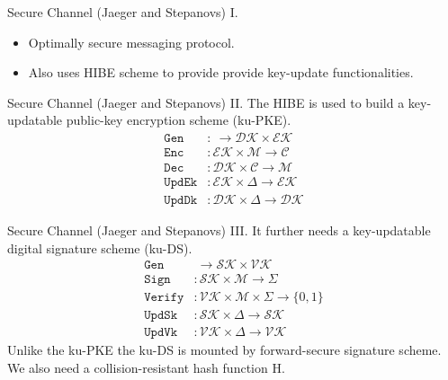 \documentclass{beamer}
\begin{document}
\begin{frame}{Secure Channel (Jaeger and Stepanovs) I.}
  \begin{itemize}
  \item Optimally secure messaging protocol.
  \item Also uses HIBE scheme to provide provide key-update
    functionalities.
  \end{itemize}
\end{frame}

\begin{frame}{Secure Channel (Jaeger and Stepanovs) II.}
  The HIBE is used to build a key-updatable public-key encryption scheme (ku-PKE).
  \begin{align*}
    \texttt{Gen} & : \ \rightarrow \mathcal{DK} \times \mathcal{EK} \\
    \texttt{Enc} & : \mathcal{EK} \times \mathcal{M} \rightarrow \mathcal{C} \\
    \texttt{Dec} & : \mathcal{DK} \times \mathcal{C} \rightarrow \mathcal{M} \\
    \texttt{UpdEk} & : \mathcal{EK} \times \Delta \rightarrow \mathcal{EK} \\
    \texttt{UpdDk} & : \mathcal{DK} \times \Delta \rightarrow \mathcal{DK}
  \end{align*}
\end{frame}

\begin{frame}{Secure Channel (Jaeger and Stepanovs) III.}
  It further needs a key-updatable digital signature scheme (ku-DS).
  \begin{align*}
    \texttt{Gen} & \  \rightarrow \mathcal{SK} \times \mathcal{VK} \\
    \texttt{Sign} & : \mathcal{SK} \times \mathcal{M} \rightarrow \Sigma \\
    \texttt{Verify} & : \mathcal{VK} \times \mathcal{M} \times \Sigma \rightarrow \{0,1\} \\
    \texttt{UpdSk} & : \mathcal{SK} \times \Delta \rightarrow \mathcal{SK} \\
    \texttt{UpdVk} & : \mathcal{VK} \times \Delta \rightarrow \mathcal{VK}
  \end{align*}
  Unlike the ku-PKE the ku-DS is mounted by forward-secure signature scheme.
  We also need a collision-resistant hash function H.
\end{frame}
\end{document}
